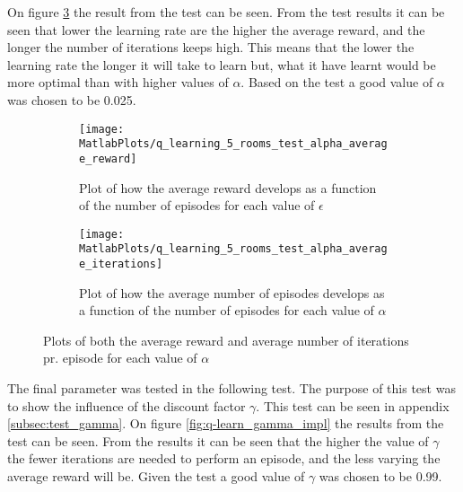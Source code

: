 \documentclass[../Head/Main.tex]{subfiles}
\begin{document}
On figure \ref{fig:q-learn_alpha_impl} the result from the test can be seen. From the test results it can be seen that lower the learning rate are the higher the average reward, and the longer the number of iterations keeps high. This means that the lower the learning rate the longer it will take to learn but, what it have learnt would be more optimal than with higher values of $\alpha$. Based on the test a good value of $\alpha$ was chosen to be 0.025.
\begin{figure}[H]
	\centering
	\begin{subfigure}[b]{0.49\textwidth}
		\centering
		\texttt{[image: MatlabPlots/q\_learning\_5\_rooms\_test\_alpha\_average\_reward]}
		\caption{Plot of how the average reward develops as a function of the number of episodes for each value of $\epsilon$}
		\label{fig:q-learn_alpha_reward_impl}
	\end{subfigure}
	\hfill
	\begin{subfigure}[b]{0.49\textwidth}
		\centering
		\texttt{[image: MatlabPlots/q\_learning\_5\_rooms\_test\_alpha\_average\_iterations]}
		\caption{Plot of how the average number of episodes develops as a function of the number of episodes for each value of $\alpha$}
		\label{fig:q-learn_alpha_iterations_impl}
	\end{subfigure}
	\caption{Plots of both the average reward and average number of iterations pr. episode for each value of $\alpha$}
	\label{fig:q-learn_alpha_impl}
\end{figure}
The final parameter was tested in the following test. The purpose of this test was to show the influence of the discount factor $\gamma$. This test can be seen in appendix \ref{subsec:test_gamma}. On figure \ref{fig:q-learn_gamma_impl} the results from the test can be seen. From the results it can be seen that the higher the value of $\gamma$ the fewer iterations are needed to perform an episode, and the less varying the average reward will be. Given the test a good value of $\gamma$ was chosen to be 0.99.
\end{document}
